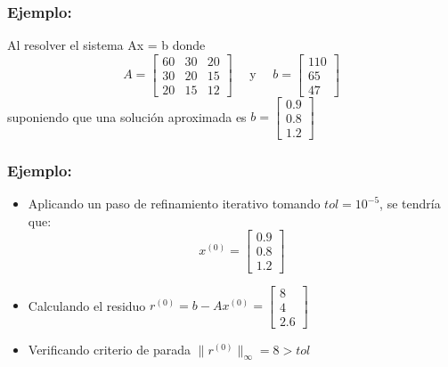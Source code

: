 \documentclass{beamer}
\begin{document}
  \begin{frame}
    \frametitle{Ejemplo:}
    Al resolver el sistema Ax = b donde
    $$
    A = \left[\begin{array}{ccc}
      60 & 30 & 20\\
      30 & 20 & 15\\
      20 & 15 & 12
    \end{array}\right] \quad \text{ y } \quad b = \left[\begin{array}{c}
      110\\
      65\\
      47
    \end{array}\right]
    $$
    suponiendo que una soluci\'on aproximada es $b = \left[\begin{array}{c}
      0.9\\
      0.8\\
      1.2
    \end{array}\right]$
  \end{frame}
  \begin{frame}
    \frametitle{Ejemplo:}
    \begin{itemize}
    \item Aplicando un paso de refinamiento iterativo tomando $tol = 10^{-5}$, se tendr\'ia que:
    $$
    x^{(0)} = \left[\begin{array}{c}
      0.9\\
      0.8\\
      1.2
    \end{array}\right]
    $$
    \item<2-> Calculando el residuo $r^{(0)} = b - Ax^{(0)} = \left[\begin{array}{c}
      8\\
      4\\
      2.6
    \end{array}\right]$
    \item<3->Verificando criterio de parada $\|r^{(0)}\|_{\infty} = 8 > tol$
  \end{itemize}
  \end{frame}
\end{document}
